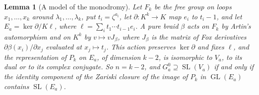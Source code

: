 \documentclass[11pt,reqno]{amsart}
\theoremstyle{plain}
\newtheorem{lemma}[theorem]{Lemma}
\theoremstyle{definition}
\theoremstyle{remark}
\DeclareMathOperator{\GL}{GL}
\DeclareMathOperator{\SL}{SL}
\begin{document}
\begin{lemma}[A model of the monodromy]\label{lem:foxmodel}
Let $F_{k}$ be the free group on loops $x_{1},\dots,x_{k}$ around
$\lambda_{1},\dots,\lambda_{k}$, put $t_{i}=\zeta^{a_{i}}$, let
$\partial\colon K^{k}\to K$ map $e_{i}$ to $t_{i}-1$, and let
$E_{a}=\ker\partial/K\ell$, where $\ell=\sum_{i}t_{1}\cdots t_{i-1}e_{i}$. A pure
braid $\beta$ acts on $F_{k}$ by Artin's automorphism and on $K^{k}$ by
$v\mapsto vJ_{\beta}$, where $J_{\beta}$ is the matrix of Fox derivatives
$\partial\beta(x_{i})/\partial x_{j}$ evaluated at $x_{j}\mapsto t_{j}$. This
action preserves $\ker\partial$ and fixes $\ell$, and the representation of
$P_{k}$ on $E_{a}$, of dimension $k-2$, is isomorphic to $V_{a}$, to its dual
or to its complex conjugate. So $n=k-2$, and $G_{a}^{0}\supseteq\SL(V_{a})$ if
and only if the identity component of the Zariski closure of the image of
$P_{k}$ in $\GL(E_{a})$ contains $\SL(E_{a})$.
\end{lemma}
\end{document}
